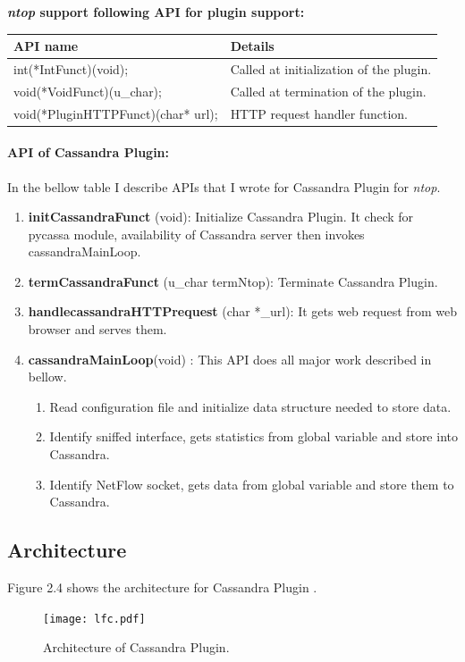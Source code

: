       \textbf{\emph{ntop} support following API for plugin support:}\\
     
     \begin{tabular}{|l|l|}
	\hline
	\textbf{API name} &  \textbf{Details}\\
	\hline
	int(*IntFunct)(void); & Called at initialization of the plugin.\\
	\hline
	void(*VoidFunct)(u\_char); & Called at termination of the plugin.\\
	\hline
	void(*PluginHTTPFunct)(char* url); & HTTP request handler function.\\
	\hline
      \end{tabular}
      
      
      \paragraph{API of Cassandra Plugin:}In the bellow table I describe APIs that I wrote for
      Cassandra Plugin for \emph{ntop}.\\
      
      
      \begin{enumerate}
       \item {\bf initCassandraFunct } (void): Initialize Cassandra Plugin. It check for pycassa module, 
	      availability of Cassandra server then invokes cassandraMainLoop.
       \item {\bf termCassandraFunct} (u\_char termNtop): Terminate Cassandra Plugin.
       \item {\bf handlecassandraHTTPrequest} (char *\_url): It gets web request from web browser and serves them.\\
       \item {\bf cassandraMainLoop}(void) : This API does all major work described in bellow.
	      \begin{enumerate}
	      \item Read configuration file and initialize data structure needed to store data.
	       \item Identify sniffed interface, gets statistics from global variable and store into Cassandra.
	       \item Identify NetFlow socket, gets data from global variable and store them to Cassandra. 
	      \end{enumerate}
      \end{enumerate}
      \subsection{Architecture}
      Figure 2.4 shows the architecture for Cassandra Plugin .
                \begin{figure}[htb]
	    \centering
	    \texttt{[image: lfc.pdf]}
	    \caption{Architecture of Cassandra Plugin.} 
	  \end{figure}